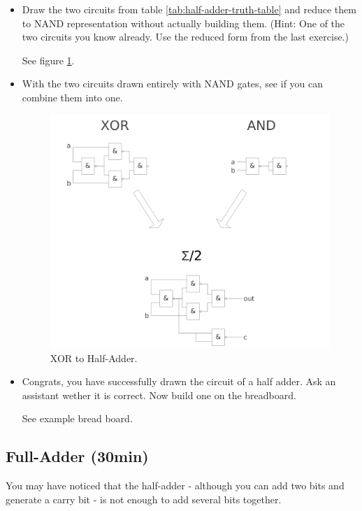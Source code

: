 \documentclass[10pt,a4paper]{article}
\begin{document}
\begin{itemize}
		\item Draw the two circuits from table \ref{tab:half-adder-truth-table} and reduce them to NAND representation without actually building them. (Hint: One of the two circuits you know already. Use the reduced form from the last exercise.)
		\begin{center}
			See figure \ref{fig:xor-to-half-adder}.
		\end{center}
		\item With the two circuits drawn entirely with NAND gates, see if you can combine them into one.
		\begin{figure}[H]
			\centering		  
			\includegraphics[scale=0.3]{xor_to_half_adder}
			\caption{XOR to Half-Adder.}
			\label{fig:xor-to-half-adder}
		\end{figure}
		\item Congrats, you have successfully drawn the circuit of a half adder. Ask an assistant wether it is correct. Now build one on the breadboard.
		\begin{center}
			See example bread board.
		\end{center}		
	\end{itemize}


	\subsection{Full-Adder (30min)}
	You may have noticed that the half-adder - although you can add two bits and generate a carry bit - is not enough to add several bits together.
	
\end{document}
